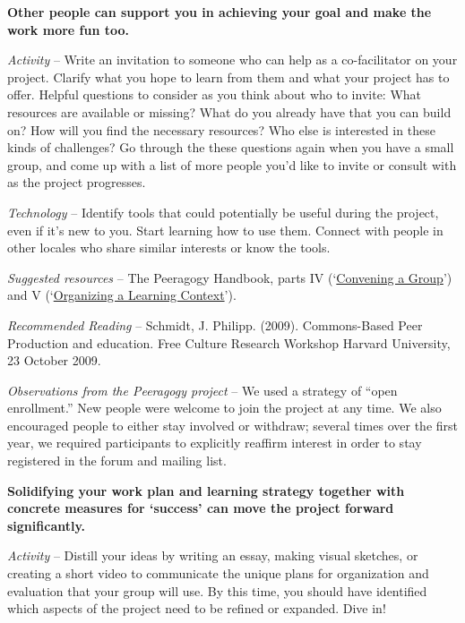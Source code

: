 \textbf{Other people can support you in achieving your goal and make the
work more fun too.}

\emph{Activity} -- Write an invitation to someone who can help as a
co-facilitator on your project. Clarify what you hope to learn from them
and what your project has to offer. Helpful questions to consider as you
think about who to invite: What resources are available or missing? What
do you already have that you can build on? How will you find the
necessary resources? Who else is interested in these kinds of
challenges? Go through the these questions again when you have a small
group, and come up with a list of more people you'd like to invite or
consult with as the project progresses.

\emph{Technology} -- Identify tools that could potentially be useful
during the project, even if it's new to you. Start learning how to use
them. Connect with people in other locales who share similar interests
or know the tools.

\emph{Suggested resources} -- The Peeragogy Handbook, parts IV
(`\href{http://peeragogy.org/convening-a-group/}{Convening a Group}')
and V
(`\href{http://peeragogy.org/organizing-a-learning-context/}{Organizing
a Learning Context}').

\emph{Recommended Reading} -- Schmidt, J. Philipp. (2009). Commons-Based
Peer Production and education. Free Culture Research Workshop Harvard
University, 23 October 2009.

\emph{Observations from the Peeragogy project} -- We used a strategy of
``open enrollment.'' New people were welcome to join the project at any
time. We also encouraged people to either stay involved or withdraw;
several times over the first year, we required participants to
explicitly reaffirm interest in order to stay registered in the forum
and mailing list.

\noindent{}

\textbf{Solidifying your work plan and learning strategy together with
concrete measures for `success' can move the project forward
significantly.}

\emph{Activity} -- Distill your ideas by writing an essay, making visual
sketches, or creating a short video to communicate the unique plans for
organization and evaluation that your group will use. By this time, you
should have identified which aspects of the project need to be refined
or expanded. Dive in!

